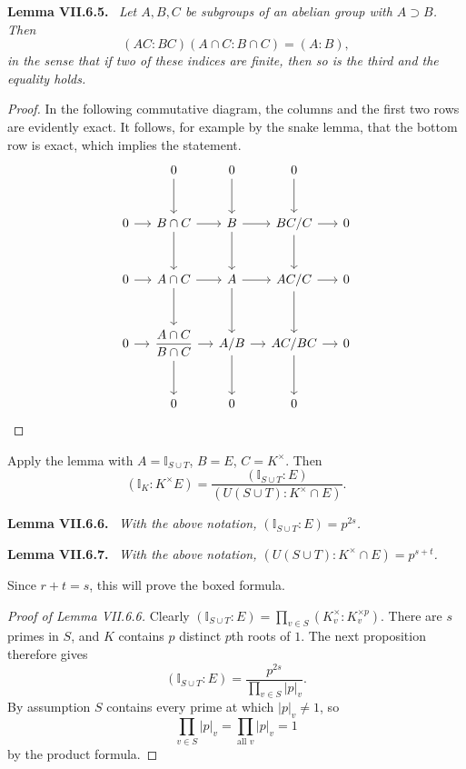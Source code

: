 \documentclass[11pt]{article}
\newcommand{\I}{\mathbb I}
\newenvironment{authorresult}[2]{\par\medskip\noindent\textbf{#1 VII.#2.}\ \itshape}{\par\medskip}
\begin{document}
\begin{authorresult}{Lemma}{6.5}
Let $A,B,C$ be subgroups of an abelian group with $A\supset B$. Then
\[
 (AC:BC)(A\cap C:B\cap C)=(A:B),
\]
in the sense that if two of these indices are finite, then so is the third
and the equality holds.
\end{authorresult}
\begin{proof}
In the following commutative diagram, the columns and the first two rows
are evidently exact. It follows, for example by the snake lemma, that the
bottom row is exact, which implies the statement.
\[
\begin{tikzcd}[column sep=small,row sep=large]
 &0\arrow[d]&0\arrow[d]&0\arrow[d]&\\
0\arrow[r]&B\cap C\arrow[r]\arrow[d]&B\arrow[r]\arrow[d]&BC/C\arrow[r]\arrow[d]&0\\
0\arrow[r]&A\cap C\arrow[r]\arrow[d]&A\arrow[r]\arrow[d]&AC/C\arrow[r]\arrow[d]&0\\
0\arrow[r]&\dfrac{A\cap C}{B\cap C}\arrow[r]\arrow[d]&A/B\arrow[r]\arrow[d]&AC/BC\arrow[r]\arrow[d]&0\\
 &0&0&0&
\end{tikzcd}
\]
\end{proof}

Apply the lemma with $A=\I_{S\cup T}$, $B=E$, $C=K^\times$. Then
\[
 (\I_K:K^\times E)
 =\frac{(\I_{S\cup T}:E)}{(U(S\cup T):K^\times\cap E)}.
\]
\begin{authorresult}{Lemma}{6.6}
With the above notation, $(\I_{S\cup T}:E)=p^{2s}$.
\end{authorresult}
\begin{authorresult}{Lemma}{6.7}
With the above notation, $(U(S\cup T):K^\times\cap E)=p^{s+t}$.
\end{authorresult}
Since $r+t=s$, this will prove the boxed formula.

\begin{proof}[Proof of Lemma VII.6.6]
Clearly $(\I_{S\cup T}:E)=\prod_{v\in S}(K_v^\times:K_v^{\times p})$.
There are $s$ primes in $S$, and $K$ contains $p$ distinct $p$th roots of $1$.
The next proposition therefore gives
\[
 (\I_{S\cup T}:E)=\frac{p^{2s}}{\prod_{v\in S}|p|_v}.
\]
By assumption $S$ contains every prime at which $|p|_v\ne1$, so
\[
 \prod_{v\in S}|p|_v=\prod_{\text{all }v}|p|_v=1
\]
by the product formula.
\end{proof}
\end{document}

